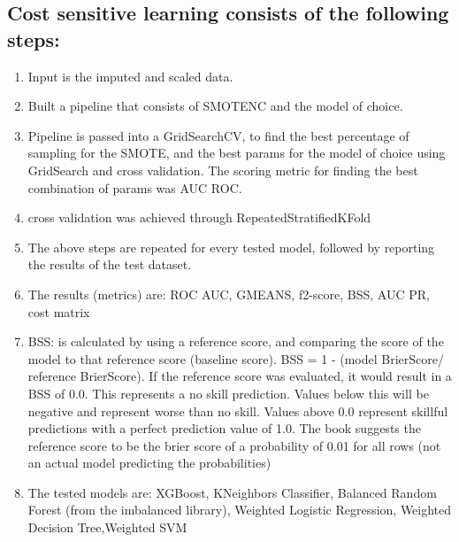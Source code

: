 \documentclass{article}
\begin{document}
\subsection{Cost sensitive learning consists of the following steps:}
\begin{enumerate}
    \item Input is the imputed and scaled data.
    \item Built a pipeline that consists of SMOTENC and the model of choice.
    \item Pipeline is passed into a GridSearchCV, to find the best percentage of sampling for the SMOTE, and the best params for the model of choice using GridSearch and cross validation. The scoring metric for finding the best combination of params was AUC ROC.
    \item cross validation was achieved through RepeatedStratifiedKFold%
    \item The above steps are repeated for every tested model, followed by reporting the results of the test dataset.
    \item The results (metrics) are: ROC AUC, GMEANS, f2-score, BSS, AUC PR, cost matrix
    \item BSS: is calculated by using a reference score, and comparing the score of the model to that reference score (baseline score). BSS = 1 - (model BrierScore/ reference BrierScore). If the reference score was evaluated, it would result in a BSS of 0.0. This represents a no skill prediction. Values below this will be negative and represent worse than no skill. Values above 0.0 represent skillful predictions with a perfect prediction value of 1.0. The book suggests the reference score to be the brier score of a probability of 0.01 for all rows (not an actual model predicting the probabilities)
    \item The tested models are: XGBoost, KNeighbors Classifier, Balanced Random Forest (from the imbalanced library), Weighted Logistic Regression, Weighted Decision Tree,Weighted SVM
\end{enumerate}
\end{document}
